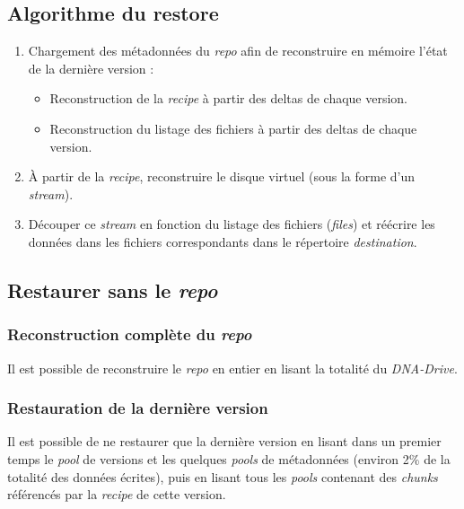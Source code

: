 \documentclass[a4paper]{article}
\begin{document}
\subsection{Algorithme du restore}

\begin{enumerate}
\item
  Chargement des métadonnées du \emph{repo} afin de reconstruire en
  mémoire l'état de la dernière version :

  \begin{itemize}
  \item
    Reconstruction de la \emph{recipe} à partir des deltas de chaque
    version.
  \item
    Reconstruction du listage des fichiers à partir des deltas de chaque
    version.
  \end{itemize}
\item
  À partir de la \emph{recipe}, reconstruire le disque virtuel (sous la
  forme d'un \emph{stream}).
\item
  Découper ce \emph{stream} en fonction du listage des fichiers
  (\emph{files}) et réécrire les données dans les fichiers
  correspondants dans le répertoire \emph{destination}.
\end{enumerate}

\subsection{\texorpdfstring{Restaurer sans le
\emph{repo}}{Restaurer sans le repo}}

\subsubsection{\texorpdfstring{Reconstruction complète du
\emph{repo}}{Reconstruction complète du repo}}

Il est possible de reconstruire le \emph{repo} en entier en lisant la
totalité du \emph{DNA-Drive}.

\subsubsection{Restauration de la dernière
version}

Il est possible de ne restaurer que la dernière version en lisant dans
un premier temps le \emph{pool} de versions et les quelques \emph{pools}
de métadonnées (environ 2\% de la totalité des données écrites), puis en
lisant tous les \emph{pools} contenant des \emph{chunks} référencés par
la \emph{recipe} de cette version.
\end{document}
